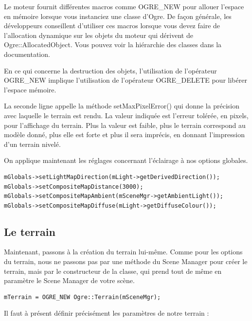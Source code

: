 Le moteur fournit diff\'erentes macros comme OGRE\_NEW pour allouer l'espace en m\'emoire lorsque vous instanciez une classe d'Ogre. De fa\c{c}on g\'en\'erale, les d\'eveloppeurs conseillent d'utiliser ces macros lorsque vous devez faire de l'allocation dynamique sur les objets du moteur qui d\'erivent de Ogre::AllocatedObject. Vous pouvez voir la hi\'erarchie des classes dans la documentation.

En ce qui concerne la destruction des objets, l'utilisation de l'op\'erateur OGRE\_NEW implique l'utilisation de l'op\'erateur OGRE\_DELETE pour lib\'erer l'espace m\'emoire.

La seconde ligne appelle la m\'ethode setMaxPixelError() qui donne la pr\'ecision avec laquelle le terrain est rendu. La valeur indiqu\'ee est l'erreur tol\'er\'ee, en pixels, pour l'affichage du terrain. Plus la valeur est faible, plus le terrain correspond au mod\`ele donn\'e, plus elle est forte et plus il sera impr\'ecis, en donnant l'impression d'un terrain nivel\'e.

On applique maintenant les r\'eglages concernant l'\'eclairage \`a nos options globales.

\begin{lstlisting}[caption={Application des r\'eglages}]
mGlobals->setLightMapDirection(mLight->getDerivedDirection());
mGlobals->setCompositeMapDistance(3000);
mGlobals->setCompositeMapAmbient(mSceneMgr->getAmbientLight());
mGlobals->setCompositeMapDiffuse(mLight->getDiffuseColour());
\end{lstlisting}




\subsection{Le terrain}


Maintenant, passons \`a la cr\'eation du terrain lui-m\^eme. Comme pour les options du terrain, nous ne passons pas par une m\'ethode du Scene Manager pour cr\'eer le terrain, mais par le constructeur de la classe, qui prend tout de m\^eme en param\`etre le Scene Manager de votre sc\`ene.

\begin{lstlisting}[caption={Cr\'eation du terrain}]
mTerrain = OGRE_NEW Ogre::Terrain(mSceneMgr);
\end{lstlisting}

Il faut \`a pr\'esent d\'efinir pr\'ecis\'ement les param\`etres de notre terrain :

